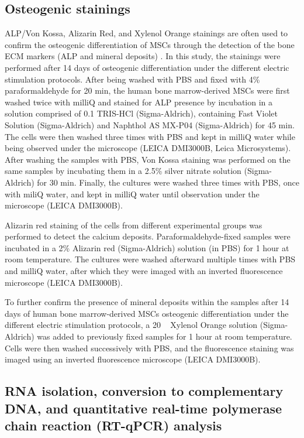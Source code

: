 \subsection{Osteogenic stainings} 
\ac{ALP}/Von Kossa, Alizarin Red, and Xylenol Orange stainings are often used to confirm the osteogenic differentiation of \ac{MSCs} through the detection of the bone \ac{ECM} markers (\ac{ALP} and mineral deposits) \cite{Zhou2021-av}. In this study, the stainings were performed after 14 days of osteogenic differentiation under the different electric stimulation protocols. After being washed with \ac{PBS} and fixed with 4\si{\percent} paraformaldehyde for 20 min, the human bone marrow-derived \ac{MSCs} were first washed twice with milliQ and stained for ALP presence by incubation in a solution comprised of 0.1 \si{\molar} TRIS-HCl (Sigma-Aldrich), containing Fast Violet Solution (Sigma-Aldrich) and Naphthol AS MX-P04 (Sigma-Aldrich) for 45 min. The cells were then washed three times with \ac{PBS} and kept in milliQ water while being observed under the microscope (LEICA DMI3000B, Leica Microsystems). After washing the samples with \ac{PBS}, Von Kossa staining was performed on the same samples by incubating them in a 2.5\si{\percent} silver nitrate solution (Sigma-Aldrich) for 30 min. Finally, the cultures were washed three times with \ac{PBS}, once with miliQ water, and kept in milliQ water until observation under the microscope (LEICA DMI3000B). 

Alizarin red staining of the cells from different experimental groups was performed to detect the calcium deposits. Paraformaldehyde-fixed samples were incubated in a 2\si{\percent} Alizarin red (Sigma-Aldrich) solution (in \ac{PBS}) for 1 hour at room temperature. The cultures were washed afterward multiple times with \ac{PBS} and milliQ water, after which they were imaged with an inverted fluorescence microscope (LEICA DMI3000B).  

To further confirm the presence of mineral deposits within the samples after 14 days of human bone marrow-derived \ac{MSCs} osteogenic differentiation under the different electric stimulation protocols, a 20 \si{\milli\molar} Xylenol Orange solution (Sigma-Aldrich) was added to previously fixed samples for 1 hour at room temperature. Cells were then washed successively with \ac{PBS}, and the fluorescence staining was imaged using an inverted fluorescence microscope (LEICA DMI3000B).

\subsection{\acs{RNA} isolation, conversion to complementary \acs{DNA}, and quantitative real-time polymerase chain reaction (\acs{RT-qPCR}) analysis} 

